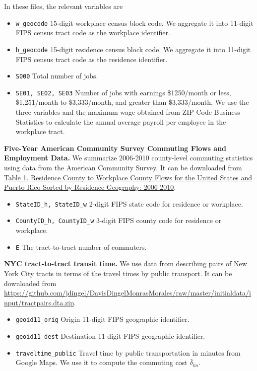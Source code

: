 \documentclass[11pt]{article}
\theoremstyle{definition}
\begin{document}
In these files, the relevant variables are 
\begin{itemize}
\item \texttt{w\_geocode} 15-digit workplace census block code. 
We aggregate it into 11-digit FIPS census tract code as the workplace identifier.
\item \texttt{h\_geocode} 15-digit residence census block code. 
We aggregate it into 11-digit FIPS census tract code as the residence identifier.
\item \texttt{S000} Total number of jobs.
\item \texttt{SE01, SE02, SE03} Number of jobs with earnings \$1250/month or less, 
\$1,251/month to \$3,333/month, and greater than \$3,333/month. 
We use the three variables and the maximum wage obtained from ZIP Code Business 
Statistics to calculate the annual average payroll per employee in the workplace tract.  
\end{itemize}

\noindent \textbf{Five-Year American Community Survey Commuting Flows and Employment Data.} 
We summarize 2006-2010 county-level commuting statistics using data from the American Community Survey. 
It can be downloaded from 
\href{https://www2.census.gov/programs-surveys/demo/tables/metro-micro/2010/commuting-employment-2010/table1.xlsx}{Table 1. Residence County to Workplace County Flows for the United States and Puerto Rico Sorted by Residence Geography: 2006-2010}.

\begin{itemize}
\item \texttt{StateID\_h, StateID\_w} 2-digit FIPS state code for residence or workplace.
\item \texttt{CountyID\_h, CountyID\_w} 3-digit FIPS county code for residence or workplace.
\item \texttt{E} The tract-to-tract number of commuters.
\end{itemize}

\noindent \textbf{NYC tract-to-tract transit time.} We use data from  describing pairs of New York City tracts in terms of the travel times by public transport. It can be downloaded from \url{https://github.com/jdingel/DavisDingelMonrasMorales/raw/master/initialdata/input/tractpairs.dta.zip}.

\begin{itemize}
\item \texttt{geoid11\_orig} Origin 11-digit FIPS geographic identifier.
\item \texttt{geoid11\_dest} Destination 11-digit FIPS geographic identifier.
\item \texttt{traveltime\_public} Travel time by public transportation in minutes from Google Maps. 
We use it to compute the commuting cost $\bar{\delta}_{kn}$.
\end{itemize}
\end{document}
